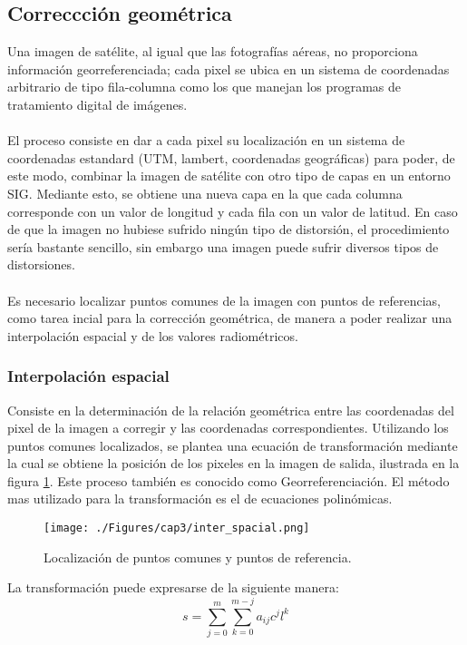 \subsection{Correccci\'on geom\'etrica}
Una imagen de sat\'elite, al igual que las fotograf\'ias a\'ereas, no proporciona informaci\'on georreferenciada; cada pixel se ubica en un sistema de coordenadas arbitrario de tipo fila-columna como los que manejan los programas de tratamiento digital de im\'agenes.\\~\\
El proceso consiste en dar a cada pixel su localizaci\'on en un sistema de coordenadas estandard (UTM, lambert, coordenadas geogr\'aficas) para poder, de este modo, combinar la imagen de sat\'elite con otro tipo de capas en un entorno SIG. Mediante esto, se obtiene una nueva capa en la que cada columna corresponde con un valor de longitud y cada fila con un valor de latitud. En caso de que la imagen no hubiese sufrido ningún tipo de distorsi\'on, el procedimiento ser\'ia bastante sencillo, sin embargo una imagen puede sufrir diversos tipos de distorsiones.\\~\\
Es necesario localizar puntos comunes de la imagen con puntos de referencias, como tarea incial para la correcci\'on geom\'etrica, de manera a poder realizar una interpolaci\'on espacial y de los valores radiom\'etricos\cite{deniseCultivos}.

\subsubsection{Interpolaci\'on espacial}
Consiste en la determinaci\'on de la relaci\'on geom\'etrica entre las coordenadas del pixel de la imagen a corregir y las coordenadas correspondientes. Utilizando los puntos comunes localizados, se plantea una ecuaci\'on de transformaci\'on mediante la cual se obtiene la posici\'on de los pixeles en la imagen de salida, ilustrada en la figura \ref{fig:intEspacial}. Este proceso tambi\'en es conocido como Georreferenciaci\'on. El m\'etodo mas utilizado para la transformaci\'on es el de ecuaciones polin\'omicas. 
    \begin{figure}[H]
    	\centering
    	\texttt{[image: ./Figures/cap3/inter\_spacial.png]}
    	\caption{Localizaci\'on de puntos comunes y puntos de referencia.}
    	\label{fig:intEspacial}
    \end{figure}
 
 La transformaci\'on puede expresarse de la siguiente manera:
	\begin{equation}
	s = \sum_{j=0}^{m} \sum_{k=0}^{m-j} a_{ij}c^{j}l^{k}
	\end{equation} 

